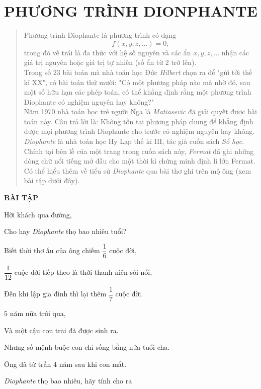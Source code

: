 \section{PHƯƠNG TRÌNH DIONPHANTE}

\begin{quote}
Phương trình Diophante là phương trình có dạng
$$f(x,y,z,\ldots)=0{,}$$
trong đó vế trái là đa thức với hệ số nguyên và các ẩn $x,y,z,\ldots$ nhận các giá trị nguyên hoặc giá trị tự nhiên (số ẩn từ $2$ trở lên).\\
Trong số $23$ bài toán mà nhà toán học Đức \textit{Hilbert} chọn ra để "gửi tới thế kỉ XX", có bài toán thứ mười: "Có một phương pháp nào mà nhờ đó, sau một số hữu hạn các phép toán, có thể khẳng định rằng một phương trình Diophante có nghiệm nguyên hay không?"\\
Năm 1970 nhà toán học trẻ người Nga là \textit{Matiasevic} đã giải quyết được bài toán này. Câu trả lời là: Không tồn tại phương pháp chung để khẳng định được mọi phương trình Diophante cho trước có nghiệm nguyên hay không.\\
\textit{Diophante} là nhà toán học Hy Lạp thế kỉ III, tác giả cuốn sách \textit{Số học}. Chính tại bên lề của một trang trong cuốn sách này, \textit{Fermat} đã ghi những dòng chữ nổi tiếng mở đầu cho một thời kì chứng minh định lí lớn Fermat.\\
Có thể hiểu thêm về tiểu sử \textit{Diophante} qua bài thơ ghi trên mộ ông (xem bài tập dưới đây).
\end{quote}
\begin{center}
\textbf{BÀI TẬP}
\end{center}

\begin{bt}
Hỡi khách qua đường,

Cho hay \textit{Diophante} thọ bao nhiêu tuổi?

Biết thời thơ ấu của ông chiếm $\dfrac{1}{6}$ cuộc đời,

$\dfrac{1}{12}$ cuộc đời tiếp theo là thời thanh niên sôi nổi,

Đến khi lập gia đình thì lại thêm $\dfrac{1}{7}$ cuộc đời.

$5$ năm nữa trôi qua,

Và một cậu con trai đã được sinh ra.

Nhưng số mệnh buộc con chỉ sống bằng nửa tuổi cha.

Ông đã từ trần $4$ năm sau khi con mất.

\textit{Diophante} thọ bao nhiêu, hãy tính cho ra
\end{bt}

